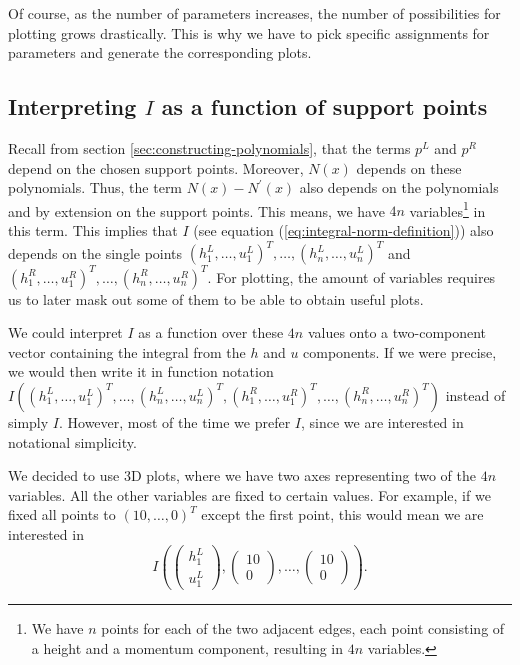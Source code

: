 \documentclass{article}
\begin{document}
Of course, as the number of parameters increases, the number of possibilities for plotting grows drastically. This is why we have to pick specific assignments for parameters and generate the corresponding plots.

\subsection{\texorpdfstring{Interpreting $I$ as a function of support points}{Interpreting I as a function of support points}}
\label{sec:some-considerations}

Recall from section \ref{sec:constructing-polynomials}, that the terms $p^L$ and $p^R$ depend on the chosen support points. Moreover, $N\left(x\right)$ depends on these polynomials. Thus, the term $N\left(x\right)-N^\prime\left(x\right)$ also depends on the polynomials and by extension on the support points. This means, we have $4n$ variables\footnote{We have $n$ points for each of the two adjacent edges, each point consisting of a height and a momentum component, resulting in $4n$ variables.} in this term.
This implies that $I$ (see equation (\ref{eq:integral-norm-definition})) also depends on the single points
$( h_1^L , \dots, u_1^L)^T ,\dots, ( h_n^L , \dots, u_n^L)^T$ and $( h_1^R , \dots, u_1^R)^T ,\dots,( h_n^R , \dots, u_n^R)^T $.
For plotting, the amount of variables requires us to later mask out some of them to be able to obtain useful plots.

We could interpret $I$ as a function over these $4n$ values onto a two-component vector containing the integral from the $h$ and $u$ components. If we were precise, we would then write it in function notation $
I\left(
  ( h_1^L , \dots, u_1^L)^T ,\dots,
( h_n^L , \dots, u_n^L)^T ,
( h_1^R , \dots, u_1^R)^T ,\dots,
( h_n^R , \dots, u_n^R)^T \right)$ instead of simply $I$. However, most of the time we prefer $I$, since we are interested in notational simplicity.

We decided to use 3D plots, where we have two axes representing two of the $4n$ variables. All the other variables are fixed to certain values.
For example, if we fixed all points to $( 10 , \dots, 0)^T$ except the first point, this would mean we are interested in
\begin{equation*}
  I\left(
    \begin{pmatrix}
      h_1^L \\ u_1^L
    \end{pmatrix},
    \begin{pmatrix}
      10 \\ 0
    \end{pmatrix}, \dots,
    \begin{pmatrix}
      10 \\ 0
    \end{pmatrix}
  \right).
\end{equation*}
\end{document}
